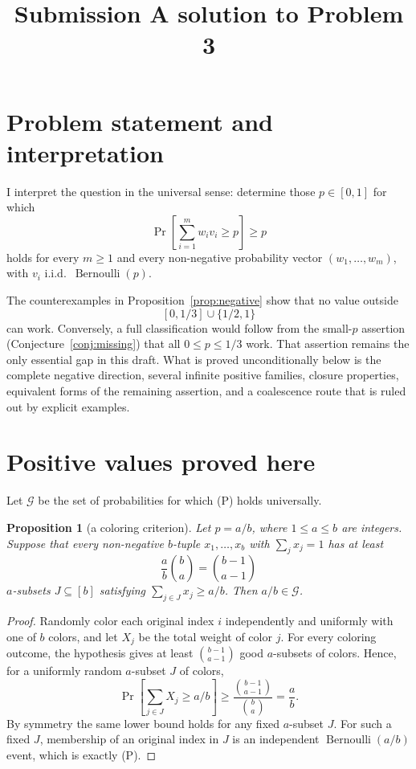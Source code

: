 \documentclass[12pt]{article}
\newtheorem{proposition}{Proposition}
\newcommand{\Ber}{\operatorname{Bernoulli}}
\begin{document}
\title{Submission A solution to Problem 3}
\date{}
\maketitle


\section*{Problem statement and interpretation}

I interpret the question in the universal sense: determine those \(p\in[0,1]\)
for which
\[
        \Pr\!\left[\sum_{i=1}^m w_i v_i\ge p\right]\ge p                  \tag{P}
\]
holds for every \(m\ge1\) and every non-negative probability vector
\((w_1,\ldots,w_m)\), with \(v_i\) i.i.d.\ \(\Ber(p)\).

The counterexamples in Proposition~\ref{prop:negative} show that no value
outside
\[
        [0,1/3]\cup\{1/2,1\}
\]
can work.  Conversely, a full classification would follow from the
small-\(p\) assertion (Conjecture~\ref{conj:missing}) that all
\(0\le p\le1/3\) work.  That assertion remains the only essential gap in this
draft.  What is proved unconditionally below is the complete negative direction,
several infinite positive families, closure properties, equivalent forms of the
remaining assertion, and a coalescence route that is ruled out by explicit
examples.

\section*{Positive values proved here}

Let \(\mathcal G\) be the set of probabilities for which (P) holds universally.

\begin{proposition}[a coloring criterion]\label{prop:criterion}
Let \(p=a/b\), where \(1\le a\le b\) are integers.  Suppose that every
non-negative \(b\)-tuple \(x_1,\ldots,x_b\) with \(\sum_j x_j=1\) has at least
\[
        \frac{a}{b}\binom ba=\binom{b-1}{a-1}
\]
\(a\)-subsets \(J\subseteq[b]\) satisfying \(\sum_{j\in J}x_j\ge a/b\).  Then
\(a/b\in\mathcal G\).
\end{proposition}

\begin{proof}
Randomly color each original index \(i\) independently and uniformly with one
of \(b\) colors, and let \(X_j\) be the total weight of color \(j\).  For every
coloring outcome, the hypothesis gives at least \(\binom{b-1}{a-1}\) good
\(a\)-subsets of colors.  Hence, for a uniformly random \(a\)-subset \(J\) of
colors,
\[
       \Pr\!\left[\sum_{j\in J}X_j\ge a/b\right]\ge
       \frac{\binom{b-1}{a-1}}{\binom ba}=\frac ab .
\]
By symmetry the same lower bound holds for any fixed \(a\)-subset \(J\).  For
such a fixed \(J\), membership of an original index in \(J\) is an independent
\(\Ber(a/b)\) event, which is exactly (P).
\end{proof}
\end{document}
